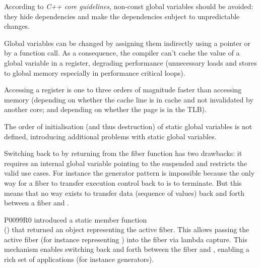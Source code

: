 \label{problem_gpub}

According to \emph{C++ core guidelines}\cite{coreguidlines}, non-const global
variables should be avoided: they hide dependencies and make the
dependencies subject to unpredictable changes.

Global variables can be changed by assigning them indirectly using a pointer or
by a function call. As a consequence, the compiler can't cache the value of a
global variable in a register, degrading performance (unnecessary
loads and stores to global memory especially in performance critical loops).

Accessing a register is one to three orders of magnitude faster than accessing
memory (depending on whether the cache line is in cache and not invalidated by
another core; and depending on whether the page is in the TLB).

The order of initialisation (and thus destruction) of static global
variables is not defined, introducing additional problems with static
global variables.


Switching back to \main by returning from the fiber function has two drawbacks:
it requires an internal global variable pointing to the suspended \main and
restricts the valid use cases.
For instance the generator pattern is impossible because the only way
for a fiber to transfer execution control back to \main is to terminate. But
this means that no way exists to transfer data (sequence of values) back and
forth between a fiber and \main.


P0099R0\cite{P0099R0} introduced a static member function\\
() that returned an object representing the active
fiber. This allows passing the active fiber  (for instance representing
\main) into the fiber  via lambda capture. This mechanism enables
switching back and forth between the fiber and \main, enabling a rich set of
applications (for instance generators).

